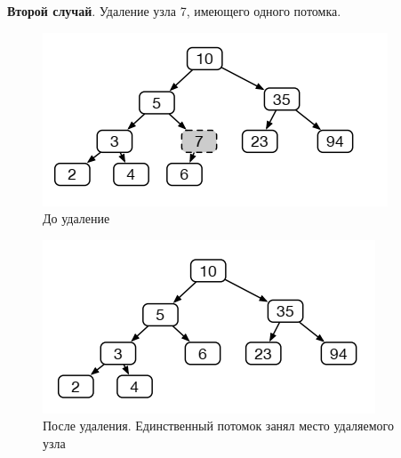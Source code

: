 \documentclass{beamer}
\begin{document}
\begin{frame}[fragile]
	\textbf{Второй случай}. Удаление узла 7, имеющего одного потомка.
	\begin{figure}[h]
		\centering
		\includegraphics[scale=0.5]{images/lec07-pic07.png}
		\caption{До удаление}
	\end{figure}
	\begin{figure}[h]
		\centering
		\includegraphics[scale=0.5]{images/lec07-pic08.png}
		\caption{После удаления. Единственный потомок занял место удаляемого узла}
	\end{figure}	
\end{frame}
\end{document}
